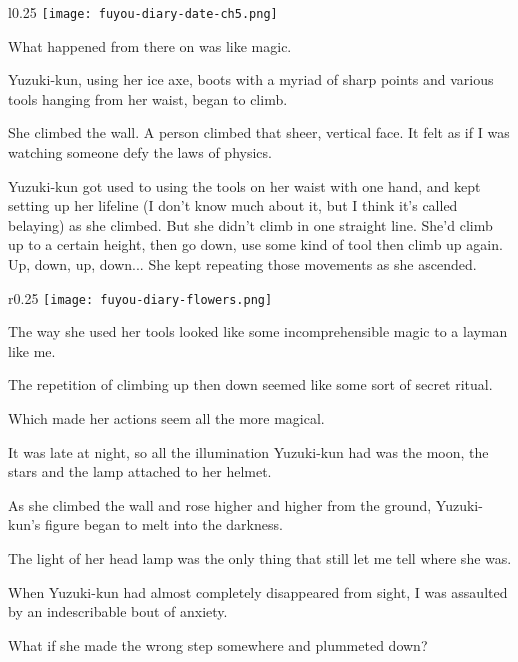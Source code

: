 \begin{center}
\begin{graphpaperBox}[enhanced,box align=center,colframe=diaryborder,width=0.9\textwidth]
\begin{wrapfigure}{l}{0.25\textwidth}
\hspace*{-5mm}\texttt{[image: fuyou-diary-date-ch5.png]}
\end{wrapfigure}

What happened from there on was like magic.

Yuzuki-kun, using her ice axe, boots with a myriad of sharp points and various tools hanging from her waist, began to climb.

She climbed the wall. A person climbed that sheer, vertical face. It felt as if I was watching someone defy the laws of physics.

Yuzuki-kun got used to using the tools on her waist with one hand, and kept setting up her lifeline (I don't know much about it, but I think it's called belaying) as she climbed. But she didn't climb in one straight line. She'd climb up to a certain height, then go down, use some kind of tool then climb up again. Up, down, up, down... She kept repeating those movements as she ascended.

\begin{wrapfigure}{r}{0.25\textwidth}
\texttt{[image: fuyou-diary-flowers.png]}
\end{wrapfigure}

The way she used her tools looked like some incomprehensible magic to a layman like me.

The repetition of climbing up then down seemed like some sort of secret ritual.

Which made her actions seem all the more magical.

It was late at night, so all the illumination Yuzuki-kun had was the moon, the stars and the lamp attached to her helmet.

As she climbed the wall and rose higher and higher from the ground, Yuzuki-kun's figure began to melt into the darkness.

The light of her head lamp was the only thing that still let me tell where she was.

When Yuzuki-kun had almost completely disappeared from sight, I was assaulted by an indescribable bout of anxiety.

What if she made the wrong step somewhere and plummeted down?


\end{graphpaperBox}
\end{center}
